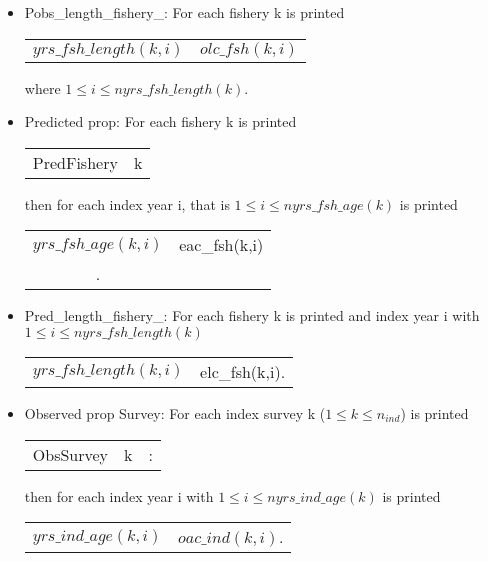 \documentclass{article}
\begin{document}
\begin{itemize}
\begin{center}
\begin{tabular}{c c}
        \end{tabular}
    \end{center}
    \item Pobs\_length\_fishery\_: For each fishery k is printed 
    \begin{center}
        \begin{tabular}{c c}
          $yrs\_fsh\_length(k,i)$   &  $olc\_fsh(k,i)$\\
            \end{tabular}        
    \end{center}
    where $1\leq i \leq nyrs\_fsh\_length(k)$.
    
    \item Predicted prop: For each fishery k is printed
    \begin{center}
        \begin{tabular}{c c}
            PredFishery  &  k \\
            
        \end{tabular}
    \end{center}
    then for each index year i, that is $1\leq i \leq nyrs\_fsh\_age(k)$ is printed
    \begin{center}
        \begin{tabular}{c c}
          $yrs\_fsh\_age(k,i)$   &  eac\_fsh(k,i)\\.
        \end{tabular}
    \end{center}
    
    \item Pred\_length\_fishery\_: For each fishery k is printed and index year i with $1\leq i \leq nyrs\_fsh\_length(k)$
    \begin{center}
        \begin{tabular}{c c}
           $yrs\_fsh\_length(k,i)$  & elc\_fsh(k,i).\\ 
        \end{tabular}
    \end{center}

    \item Observed prop Survey: For each index survey k ($1\leq k \leq n_{ind}$) is printed
    \begin{center}
        \begin{tabular}{c c c}
           ObsSurvey  &  k & :\\
        \end{tabular}
    \end{center}
    then for each index year i with $1\leq i \leq nyrs\_ind\_age(k)$ is printed
    \begin{center}
        \begin{tabular}{c c}
            $yrs\_ind\_age(k,i)$ & $oac\_ind(k,i)$. \\
        \end{tabular}
    \end{center}


\end{itemize}
\end{document}
